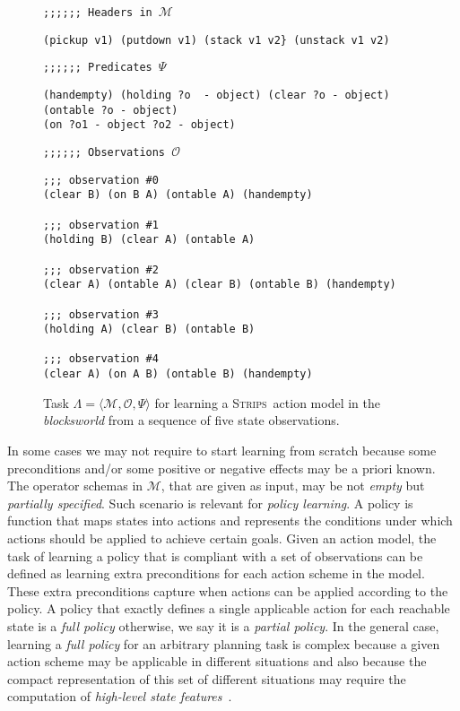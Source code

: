 \documentclass[3p,times]{elsarticle}
\newcommand{\strips}{\textsc{Strips}}     %
\newcommand{\tup}[1]{{\langle #1 \rangle}}
\begin{document}
\begin{figure}[hbt!]
{\footnotesize\tt ;;;;;; Headers in $\mathcal{M}$}
\begin{footnotesize}
\begin{verbatim}
(pickup v1) (putdown v1) (stack v1 v2} (unstack v1 v2)
\end{verbatim}
\end{footnotesize}
\vspace{0.2cm}
{\footnotesize\tt ;;;;;; Predicates $\Psi$}
\begin{footnotesize}
\begin{verbatim}
(handempty) (holding ?o  - object) (clear ?o - object) (ontable ?o - object)
(on ?o1 - object ?o2 - object)
\end{verbatim}
\end{footnotesize}
\vspace{0.2cm}
{\footnotesize\tt ;;;;;; Observations $\mathcal{O}$}
\begin{footnotesize}
\begin{verbatim}
;;; observation #0
(clear B) (on B A) (ontable A) (handempty)

;;; observation #1
(holding B) (clear A) (ontable A)

;;; observation #2
(clear A) (ontable A) (clear B) (ontable B) (handempty)

;;; observation #3
(holding A) (clear B) (ontable B)

;;; observation #4
(clear A) (on A B) (ontable B) (handempty)
\end{verbatim}
\end{footnotesize}
 \caption{\small Task $\Lambda=\tup{\mathcal{M},\mathcal{O},\Psi}$ for learning a \strips\ action model in the {\em blocksworld} from a sequence of five state observations.}
\label{fig:example-observations}
\end{figure}

In some cases we may not require to start learning from scratch because some preconditions and/or some positive or negative effects may be a priori known. The operator schemas in $\mathcal{M}$, that are given as input, may be not {\em empty} but {\em partially specified}. Such scenario is relevant for {\em policy learning}. A policy is function that maps states into actions and represents the conditions under which actions should be applied to achieve certain goals. Given an action model, the task of learning a policy that is compliant with a set of observations can be defined as learning extra preconditions for each action scheme in the model. These extra preconditions capture when actions can be applied according to the policy. A policy that exactly defines a single applicable action for each reachable state is a {\em full policy} otherwise, we say it is a {\em partial policy}. In the general case, learning a {\em full policy} for an arbitrary planning task is complex because a given action scheme may be applicable in different situations and also because the compact representation of this set of different situations may require the computation of {\em high-level state features}~\cite{lotinac2016automatic}.
\end{document}
